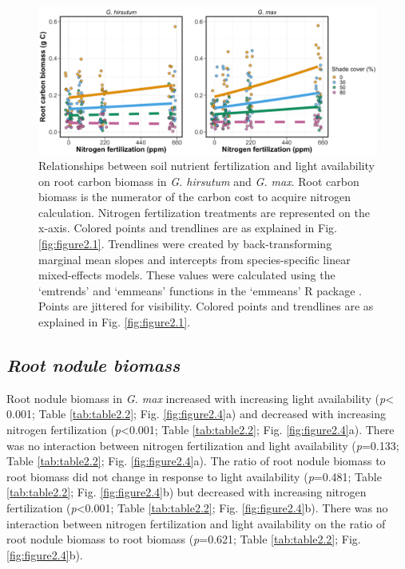 \newpage
\begin{landscape}
\begin{figure}
    \centering
    \includegraphics[width = \columnwidth]{ch2_LxN_Greenhouse/figs/fig3_rootCarbon.jpg}
    \caption[Relationships between soil nitrogen fertilization and light availability on root carbon biomass in \textit{G. hirsutum} and \textit{G. max}]{Relationships between soil nutrient fertilization and light availability on root carbon biomass in \textit{G. hirsutum} and \textit{G. max}. Root carbon biomass is the numerator of the carbon cost to acquire nitrogen calculation. Nitrogen fertilization treatments are represented on the x-axis. Colored points and trendlines are as explained in Fig. \ref{fig:figure2.1}. Trendlines were created by back-transforming marginal mean slopes and intercepts from species-specific linear mixed-effects models. These values were calculated using the `emtrends’ and `emmeans’ functions in the `emmeans’ R package . Points are jittered for visibility. Colored points and trendlines are as explained in Fig. \ref{fig:figure2.1}.}
    \label{fig:figure2.3}
\end{figure}
\end{landscape}
\clearpage

\newpage
\subsection{\textit{Root nodule biomass}}
\noindent Root nodule biomass in \textit{G. max} increased with increasing light availability (\textit{p}< 0.001; Table \ref{tab:table2.2}; Fig. \ref{fig:figure2.4}a) and decreased with increasing nitrogen fertilization (\textit{p}<0.001; Table \ref{tab:table2.2}; Fig. \ref{fig:figure2.4}a). There was no interaction between nitrogen fertilization and light availability (\textit{p}=0.133; Table \ref{tab:table2.2}; Fig. \ref{fig:figure2.4}a). The ratio of root nodule biomass to root biomass did not change in response to light availability (\textit{p}=0.481; Table \ref{tab:table2.2}; Fig. \ref{fig:figure2.4}b) but decreased with increasing nitrogen fertilization (\textit{p}<0.001; Table \ref{tab:table2.2}; Fig. \ref{fig:figure2.4}b). There was no interaction between nitrogen fertilization and light availability on the ratio of root nodule biomass to root biomass (\textit{p}=0.621; Table \ref{tab:table2.2}; Fig. \ref{fig:figure2.4}b).


